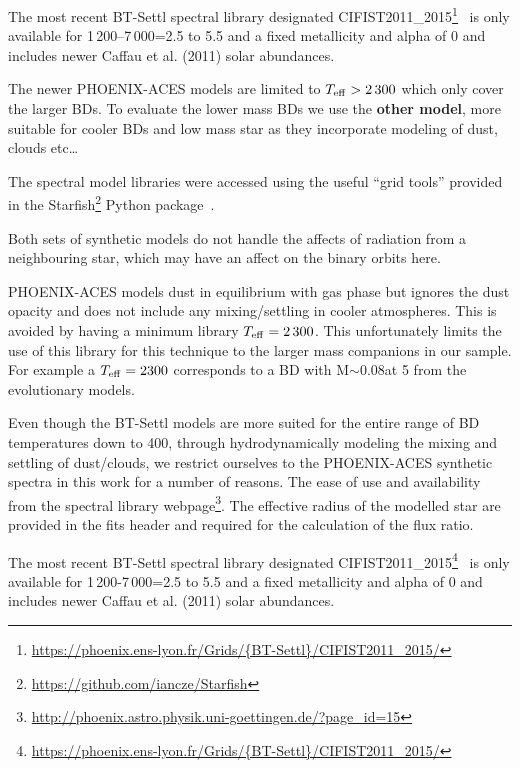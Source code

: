 The most recent {BT-Settl} spectral library designated CIFIST2011\_2015\footnote{\url{https://phoenix.ens-lyon.fr/Grids/{BT-Settl}/CIFIST2011_2015/}}~\citep{baraffe_new_2015} is only available for 1\,200--7\,000\K{}\logg{}=2.5 to 5.5 and a fixed metallicity and alpha of 0 and includes newer Caffau et al. (2011) solar abundances.

The newer {PHOENIX-ACES} models are limited to \(T_{\mathrm{eff}}{}> 2\,300\)\K{} which only cover the larger BDs. To evaluate the lower mass BDs we use the \textbf{other model}, more suitable for cooler BDs and low mass star as they incorporate modeling of dust, clouds etc\ldots


The spectral model libraries were accessed using the useful ``grid tools'' provided in the Starfish\footnote{\url{https://github.com/iancze/Starfish}} Python package~\citep{czekala_constructing_2015}.


Both sets of synthetic models do not handle the affects of radiation from a neighbouring star, which may have an affect on the binary orbits here.



{PHOENIX-ACES} models dust in equilibrium with gas phase but ignores the dust opacity and does not include any mixing/settling in cooler atmospheres. This is avoided by having a minimum library \(T_{\mathrm{eff}}{}=2\,300\)\K{}. This unfortunately limits the use of this library for this technique to the larger mass companions in our sample. For example a \(T_{\mathrm{eff}}{}=2300\)\K{} corresponds to a {BD} with M\(\sim0.08\)\Modot at 5\Gyr{} from the~\citet{baraffe_evolutionary_2003} evolutionary models.


Even though the {BT-Settl} models are more suited for the entire range of {BD} temperatures down to 400\K{}, through hydrodynamically modeling the mixing and settling of dust/clouds, we restrict ourselves to the {PHOENIX-ACES} synthetic spectra in this work for a number of reasons. The ease of use and availability from the spectral library webpage\footnote{\url{http://phoenix.astro.physik.uni-goettingen.de/?page_id=15}}. The effective radius of the modelled star are provided in the fits header and required for the calculation of the flux ratio.



The most recent {BT-Settl} spectral library designated CIFIST2011\_2015\footnote{\url{https://phoenix.ens-lyon.fr/Grids/{BT-Settl}/CIFIST2011_2015/}}~\citep{baraffe_new_2015} is only available for 1\,200-7\,000\K{}\logg{}=2.5 to 5.5 and a fixed metallicity and alpha of 0 and includes newer Caffau et al. (2011) solar abundances.

